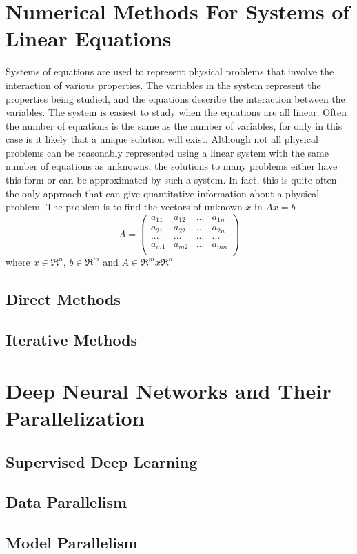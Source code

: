 \section{Numerical Methods For Systems of Linear Equations}
\label{sec:solvers}
Systems of equations are used to represent physical problems that involve the 
interaction of various properties. The variables in the system represent the 
properties being studied, and the equations describe the interaction between the 
variables. The system is easiest to study when the equations are all linear. 
Often the number of equations is the same as the number of variables, for only 
in this case is it likely that a unique solution will exist. Although not all 
physical problems can be reasonably represented using a linear system with the 
same number of equations as unknowns, the solutions to many problems either have 
this form or can be approximated by such a system. In fact, this is quite often 
the only approach that can give quantitative information about a physical 
problem. The problem is to find the vectors of unknown $x$ in $Ax = b$
$$
A=
\begin{pmatrix}
    a_{11}&a_{12}&...&a_{1n}\\
    a_{21}&a_{22}&...&a_{2n}\\
    ...&...&...&...\\
    a_{m1}&a_{m2}&...&a_{mn}\\
\end{pmatrix}
$$
where $x \in \Re^n$, $b \in \Re^m$ and $A \in \Re^m x \Re^n$

\subsection{Direct Methods}
\subsection{Iterative Methods}

\section{Deep Neural Networks and Their Parallelization}
\label{sec:dnn}
\subsection{Supervised Deep Learning}
\subsection{Data Parallelism}
\subsection{Model Parallelism}
